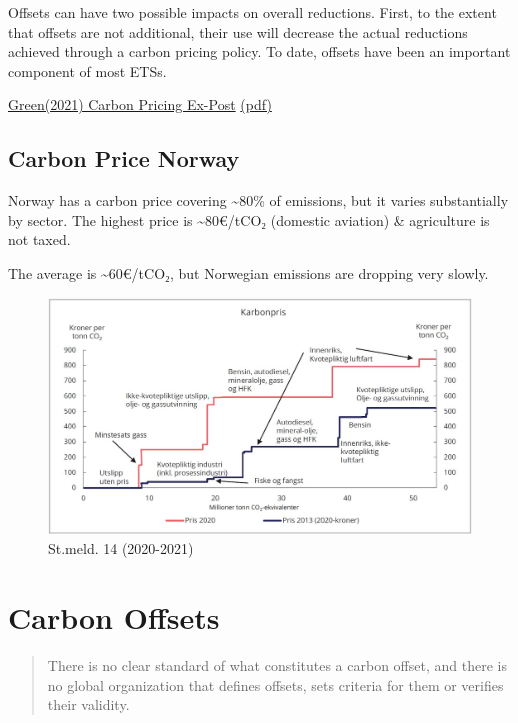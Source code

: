 \documentclass[
]{book}
\begin{document}
Offsets can have two possible impacts on overall reductions. First, to the extent that offsets are
not additional, their use will decrease the actual reductions achieved through a carbon pricing
policy.
To date, offsets have been an important component of most ETSs.

\href{https://iopscience.iop.org/article/10.1088/1748-9326/abdae9/meta}{Green(2021) Carbon Pricing Ex-Post}
\href{pdf/Green_2021_Carbon_Pricing_Ex-Post.pdf}{(pdf)}

\hypertarget{carbon-price-norway}{%
\section{Carbon Price Norway}\label{carbon-price-norway}}

Norway has a carbon price covering \textasciitilde80\% of emissions, but it varies substantially by sector. The highest price is \textasciitilde80€/tCO₂ (domestic aviation) \& agriculture is not taxed.

The average is \textasciitilde60€/tCO₂, but Norwegian emissions are dropping very slowly.

\begin{figure}
\centering
\includegraphics{fig/Norsk_Karbonpris_SM14_2021.jpeg}
\caption{St.meld. 14 (2020-2021)}
\end{figure}

\hypertarget{carbon-offsets}{%
\chapter{Carbon Offsets}\label{carbon-offsets}}

\begin{quote}
There is no clear standard of what constitutes a carbon offset, and there is no global organization that defines offsets, sets criteria for them or verifies their validity.
\end{quote}
\end{document}
